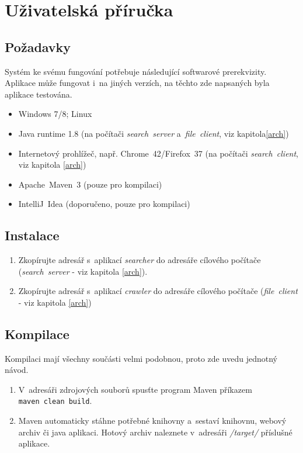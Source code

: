 \chapter{Uživatelská příručka}
\section{Požadavky}
Systém ke svému fungování potřebuje následující softwarové prerekvizity. Aplikace může fungovat i~na jiných verzích, na těchto zde napsaných byla aplikace testována.
\begin{itemize}
\item Windows 7/8; Linux
\item Java runtime 1.8 (na počítači \emph{search~server} a~\emph{file~client}, viz kapitola\ref{arch})
\item Internetový prohlížeč, např. Chrome~42/Firefox~37 (na počítači \emph{search~client}, viz kapitola \ref{arch})
\item Apache~Maven~3 (pouze pro kompilaci)
\item IntelliJ~Idea (doporučeno, pouze pro kompilaci)
\end{itemize}

\section{Instalace}
\begin{enumerate}
\item Zkopírujte adresář s~aplikací \emph{searcher} do adresáře cílového počítače (\emph{search~server} - viz kapitola \ref{arch}).
\item Zkopírujte adresář s~aplikací \emph{crawler} do adresáře cílového počítače (\emph{file~client} - viz kapitola \ref{arch})
\end{enumerate}

\section{Kompilace}
Kompilaci mají všechny součásti velmi podobnou, proto zde uvedu jednotný návod.
\begin{enumerate}
\item V~adresáři zdrojových souborů spusťte program Maven příkazem \\ \verb|maven clean build|.
\item Maven automaticky stáhne potřebné knihovny a~sestaví knihovnu, webový archiv či java aplikaci. Hotový archiv naleznete v~adresáři \emph{/target/} příslušné aplikace.
\end{enumerate} 

